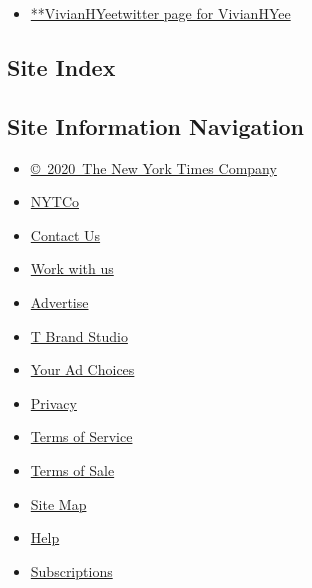 \begin{itemize}
\tightlist
\item
  \href{https://twitter.com/VivianHYee}{**VivianHYeetwitter page for
  VivianHYee}
\end{itemize}

\hypertarget{site-index}{%
\subsection{Site Index}\label{site-index}}

\hypertarget{site-information-navigation}{%
\subsection{Site Information
Navigation}\label{site-information-navigation}}

\begin{itemize}
\tightlist
\item
  \href{https://help.nytimes.com/hc/en-us/articles/115014792127-Copyright-notice}{©~2020~The
  New York Times Company}
\end{itemize}

\begin{itemize}
\tightlist
\item
  \href{https://www.nytco.com/}{NYTCo}
\item
  \href{https://help.nytimes.com/hc/en-us/articles/115015385887-Contact-Us}{Contact
  Us}
\item
  \href{https://www.nytco.com/careers/}{Work with us}
\item
  \href{https://nytmediakit.com/}{Advertise}
\item
  \href{http://www.tbrandstudio.com/}{T Brand Studio}
\item
  \href{https://www.nytimes.com/privacy/cookie-policy\#how-do-i-manage-trackers}{Your
  Ad Choices}
\item
  \href{https://www.nytimes.com/privacy}{Privacy}
\item
  \href{https://help.nytimes.com/hc/en-us/articles/115014893428-Terms-of-service}{Terms
  of Service}
\item
  \href{https://help.nytimes.com/hc/en-us/articles/115014893968-Terms-of-sale}{Terms
  of Sale}
\item
  \href{https://spiderbites.nytimes.com}{Site Map}
\item
  \href{https://help.nytimes.com/hc/en-us}{Help}
\item
  \href{https://www.nytimes.com/subscription?campaignId=37WXW}{Subscriptions}
\end{itemize}
